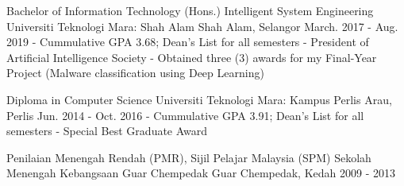 

\begin{cventries}


\cventry
  {Bachelor of Information Technology (Hons.) Intelligent System Engineering}
  {Universiti Teknologi Mara: Shah Alam}
  {Shah Alam, Selangor}
  {March. 2017 - Aug. 2019}
  {
    - Cummulative GPA 3.68; Dean's List for all semesters
    \newline
    - President of Artificial Intelligence Society
    \newline
    - Obtained three (3) awards for my Final-Year Project (Malware classification using Deep Learning)
  }

\hfill

\cventry
  {Diploma in Computer Science}
  {Universiti Teknologi Mara: Kampus Perlis}
  {Arau, Perlis}
  {Jun. 2014 - Oct. 2016}
  {
    - Cummulative GPA 3.91; Dean's List for all semesters
    \newline
    - Special Best Graduate Award
  }

\hfill

\cventry
  {Penilaian Menengah Rendah (PMR), Sijil Pelajar Malaysia (SPM)}
  {Sekolah Menengah Kebangsaan Guar Chempedak}
  {Guar Chempedak, Kedah}
  {2009 - 2013}
  {}

\end{cventries}
